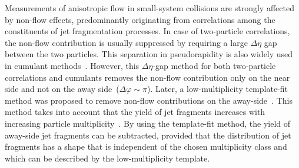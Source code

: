 Measurements of anisotropic flow in small-system collisions are strongly affected by non-flow effects, predominantly originating from correlations among the constituents of jet fragmentation processes.
In case of two-particle correlations, the non-flow contribution is usually suppressed by requiring a large $\Delta\eta$ gap between the two particles. This separation in pseudorapidity is also widely used in cumulant methods~\cite{Bilandzic:2010jr, Acharya:2019vdf}. However, this $\Delta\eta$-gap method for both two-particle correlations and cumulants removes the non-flow contribution only on the near side and not on the away side~($\Delta\varphi\sim\pi$). Later, a low-multiplicity template-fit method was proposed to remove non-flow contributions on the away-side~\cite{ATLAS:2015hzw, ATLAS:2016yzd, ATLAS:2018ngv}. This method takes into account that the yield of jet fragments increases with increasing particle multiplicity~\cite{CMS:2013ycn, ALICE:2013tla, ALICE:2014mas}.
By using the template-fit method, the yield of away-side jet fragments can be subtracted, provided that the distribution of jet fragments has a shape that is independent of the chosen multiplicity class and which can be described by the low-multiplicity template. 


